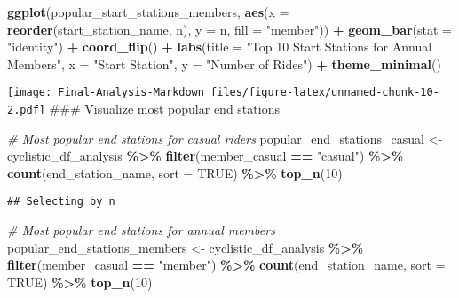\documentclass[
]{article}
\newenvironment{Shaded}{\begin{snugshade}}{\end{snugshade}}
\newcommand{\AttributeTok}[1]{\textcolor[rgb]{0.13,0.29,0.53}{#1}}
\newcommand{\CommentTok}[1]{\textcolor[rgb]{0.56,0.35,0.01}{\textit{#1}}}
\newcommand{\ConstantTok}[1]{\textcolor[rgb]{0.56,0.35,0.01}{#1}}
\newcommand{\DecValTok}[1]{\textcolor[rgb]{0.00,0.00,0.81}{#1}}
\newcommand{\FunctionTok}[1]{\textcolor[rgb]{0.13,0.29,0.53}{\textbf{#1}}}
\newcommand{\NormalTok}[1]{#1}
\newcommand{\OtherTok}[1]{\textcolor[rgb]{0.56,0.35,0.01}{#1}}
\newcommand{\SpecialCharTok}[1]{\textcolor[rgb]{0.81,0.36,0.00}{\textbf{#1}}}
\newcommand{\StringTok}[1]{\textcolor[rgb]{0.31,0.60,0.02}{#1}}
\begin{document}
\begin{Shaded}
\begin{Highlighting}[]
\FunctionTok{ggplot}\NormalTok{(popular\_start\_stations\_members, }\FunctionTok{aes}\NormalTok{(}\AttributeTok{x =} \FunctionTok{reorder}\NormalTok{(start\_station\_name, n), }\AttributeTok{y =}\NormalTok{ n, }\AttributeTok{fill =} \StringTok{"member"}\NormalTok{)) }\SpecialCharTok{+}
  \FunctionTok{geom\_bar}\NormalTok{(}\AttributeTok{stat =} \StringTok{"identity"}\NormalTok{) }\SpecialCharTok{+}
  \FunctionTok{coord\_flip}\NormalTok{() }\SpecialCharTok{+}
  \FunctionTok{labs}\NormalTok{(}\AttributeTok{title =} \StringTok{"Top 10 Start Stations for Annual Members"}\NormalTok{, }\AttributeTok{x =} \StringTok{"Start Station"}\NormalTok{, }\AttributeTok{y =} \StringTok{"Number of Rides"}\NormalTok{) }\SpecialCharTok{+}
  \FunctionTok{theme\_minimal}\NormalTok{()}
\end{Highlighting}
\end{Shaded}

\texttt{[image: Final-Analysis-Markdown\_files/figure-latex/unnamed-chunk-10-2.pdf]}
\#\#\# Visualize most popular end stations

\begin{Shaded}
\begin{Highlighting}[]
\CommentTok{\# Most popular end stations for casual riders}
\NormalTok{popular\_end\_stations\_casual }\OtherTok{\textless{}{-}}\NormalTok{ cyclistic\_df\_analysis }\SpecialCharTok{\%\textgreater{}\%}
  \FunctionTok{filter}\NormalTok{(member\_casual }\SpecialCharTok{==} \StringTok{"casual"}\NormalTok{) }\SpecialCharTok{\%\textgreater{}\%}
  \FunctionTok{count}\NormalTok{(end\_station\_name, }\AttributeTok{sort =} \ConstantTok{TRUE}\NormalTok{) }\SpecialCharTok{\%\textgreater{}\%}
  \FunctionTok{top\_n}\NormalTok{(}\DecValTok{10}\NormalTok{)}
\end{Highlighting}
\end{Shaded}

\begin{verbatim}
## Selecting by n
\end{verbatim}

\begin{Shaded}
\begin{Highlighting}[]
\CommentTok{\# Most popular end stations for annual members}
\NormalTok{popular\_end\_stations\_members }\OtherTok{\textless{}{-}}\NormalTok{ cyclistic\_df\_analysis }\SpecialCharTok{\%\textgreater{}\%}
  \FunctionTok{filter}\NormalTok{(member\_casual }\SpecialCharTok{==} \StringTok{"member"}\NormalTok{) }\SpecialCharTok{\%\textgreater{}\%}
  \FunctionTok{count}\NormalTok{(end\_station\_name, }\AttributeTok{sort =} \ConstantTok{TRUE}\NormalTok{) }\SpecialCharTok{\%\textgreater{}\%}
  \FunctionTok{top\_n}\NormalTok{(}\DecValTok{10}\NormalTok{)}
\end{Highlighting}
\end{Shaded}
\end{document}
